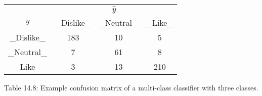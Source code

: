 \begin{table}
\begin{tabular}{c c c c} \hline \hline  & \multicolumn{3}{c}{\(\hat{y}\)} \\ \cline{2-3} \(y\) & _Dislike_ & _Neutral_ & _Like_ \\ \hline _Dislike_ & 183 & 10 & 5 \\ _Neutral_ & 7 & 61 & 8 \\ _Like_ & 3 & 13 & 210 \\ \hline \hline \end{tabular}
\end{table}
Table 14.8: Example confusion matrix of a multi-class classifier with three classes.

 